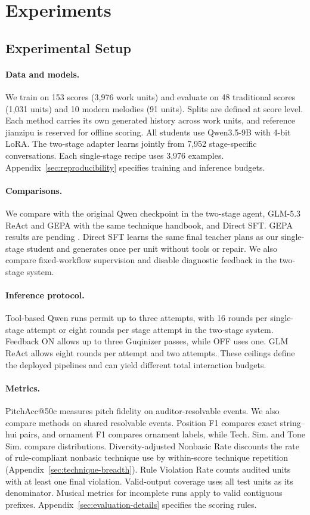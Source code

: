 \section{Experiments}\label{sec:experiments}
\subsection{Experimental Setup}

\paragraph{Data and models.}
We train on 153 scores (3,976 work units) and evaluate on 48 traditional scores (1,031 units) and 10 modern melodies (91 units). Splits are defined at score level. Each method carries its own generated history across work units, and reference jianzipu is reserved for offline scoring. All students use Qwen3.5-9B with 4-bit LoRA. The two-stage adapter learns jointly from 7,952 stage-specific conversations. Each single-stage recipe uses 3,976 examples. Appendix~\ref{sec:reproducibility} specifies training and inference budgets.

\paragraph{Comparisons.}
We compare with the original Qwen checkpoint in the two-stage agent, GLM-5.3 ReAct and GEPA with the same technique handbook, and Direct SFT. GEPA results are pending \cite{agrawal2026gepa}. Direct SFT learns the same final teacher plans as our single-stage student and generates once per unit without tools or repair. We also compare fixed-workflow supervision and disable diagnostic feedback in the two-stage system.

\paragraph{Inference protocol.}
Tool-based Qwen runs permit up to three attempts, with 16 rounds per single-stage attempt or eight rounds per stage attempt in the two-stage system. Feedback ON allows up to three Guqinizer passes, while OFF uses one. GLM ReAct allows eight rounds per attempt and two attempts. These ceilings define the deployed pipelines and can yield different total interaction budgets.

\paragraph{Metrics.}
PitchAcc@50c measures pitch fidelity on auditor-resolvable events. We also compare methods on shared resolvable events. Position F1 compares exact string--hui pairs, and ornament F1 compares ornament labels, while Tech. Sim. and Tone Sim. compare distributions. Diversity-adjusted Nonbasic Rate discounts the rate of rule-compliant nonbasic technique use by within-score technique repetition (Appendix~\ref{sec:technique-breadth}). Rule Violation Rate counts audited units with at least one final violation. Valid-output coverage uses all test units as its denominator. Musical metrics for incomplete runs apply to valid contiguous prefixes. Appendix~\ref{sec:evaluation-details} specifies the scoring rules.

